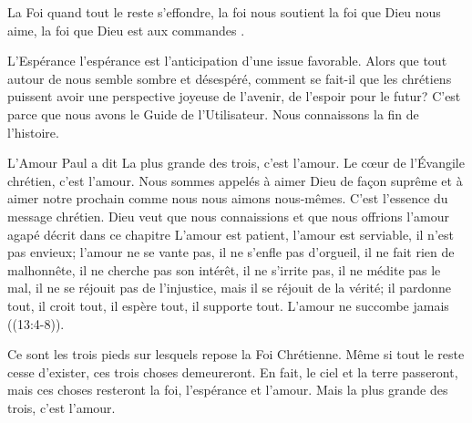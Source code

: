 La Foi \ocadr quand tout le reste s'effondre, la foi nous soutient \fcadr{}
 la foi que Dieu nous aime, la foi que Dieu est \Og aux commandes \Fg{}.

L'Espérance \ocadr l'espérance est l'anticipation d'une issue favorable.
 Alors que tout autour de nous semble sombre et désespéré,
 comment se fait-il que les chrétiens puissent avoir une perspective
 joyeuse de l'avenir, de l'espoir pour le futur?
 C'est parce que nous avons le Guide de l'Utilisateur.
 Nous connaissons la fin de l'histoire.


L'Amour \ocadr Paul a dit\frcolon{} 
 \Og La plus grande des trois, c'est l'amour. \Fg{}
 Le c\oe{}ur de l'Évangile chrétien, c'est l'amour.
 Nous sommes appelés à aimer Dieu de fa\c{c}on suprême
 et à aimer notre prochain comme nous nous aimons nous-mêmes.
 C'est l'essence du message chrétien.
 Dieu veut que nous connaissions et que nous offrions
 l'amour \Og agapé \Fg{} décrit dans ce chapitre\frcolon{}
 \Og L'amour est patient, l'amour est serviable,
 il n'est pas envieux; l'amour ne se vante pas,
 il ne s'enfle pas d'orgueil, il ne fait rien de malhonnête,
 il ne cherche pas son intérêt, il ne s'irrite pas,
 il ne médite pas le mal, il ne se réjouit pas de l'injustice,
 mais il se réjouit de la vérité;
 il pardonne tout, il croit tout, il espère tout,
 il supporte tout. L'amour ne succombe jamais \Fg{}
 ((13:4-8)). 

Ce sont les trois pieds sur lesquels repose la Foi Chrétienne. 
 Même si tout le reste cesse d'exister, ces trois choses demeureront.
 En fait, le ciel et la terre passeront, mais ces choses resteront\frcolon{}
 la foi, l'espérance et l'amour.
 Mais la plus grande des trois, c'est l'amour.

\dvrule






